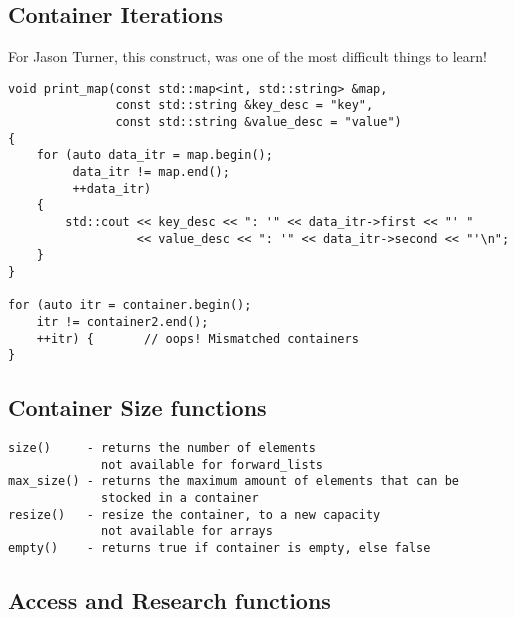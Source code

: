 \subsection{Container Iterations}

For Jason Turner, this construct, was one of the most difficult things to learn!

\begin{verbatim}
void print_map(const std::map<int, std::string> &map,
               const std::string &key_desc = "key",
               const std::string &value_desc = "value")
{
    for (auto data_itr = map.begin();
         data_itr != map.end();
         ++data_itr)
    {
        std::cout << key_desc << ": '" << data_itr->first << "' "
                  << value_desc << ": '" << data_itr->second << "'\n";
    }
}

for (auto itr = container.begin();
    itr != container2.end();
    ++itr) {       // oops! Mismatched containers
}
\end{verbatim}

\subsection{Container Size functions}

\begin{verbatim}
size()     - returns the number of elements
             not available for forward_lists
max_size() - returns the maximum amount of elements that can be
             stocked in a container
resize()   - resize the container, to a new capacity
             not available for arrays
empty()    - returns true if container is empty, else false
\end{verbatim}

\subsection{Access and Research functions}

